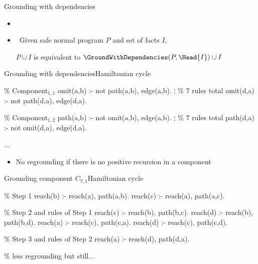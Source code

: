 \begin{frame}{Grounding with dependencies}
  \bigskip
  \begin{itemize}
  \item []


  \bigskip
  \item<2->  \ Given safe normal program \(P\) and set of facts \(I\),

    \(P \cup I\) is equivalent to \(\GroundWithDependencies(P,\Head{I}) \cup I\)
  \end{itemize}
\end{frame}
\begin{frame}{Grounding with dependencies}{Hamiltonian cycle}
\begin{SemiVerbatim}{.9}
{\color{comment}\% Component\(_{1,1}\)}
omit(a,b) :- not path(a,b), \alert{edge(a,b)}.
          \(\vdots\) {\color{comment}\% 7 rules total}
omit(d,a) :- not path(d,a), \alert{edge(d,a)}.

{\color{comment}\% Component\(_{1,2}\)}
path(a,b) :- not omit(a,b), \alert{edge(a,b)}.
          \(\vdots\) {\color{comment}\% 7 rules total}
path(d,a) :- not omit(d,a), \alert{edge(d,a)}.

...
\end{SemiVerbatim}
\vspace{-.8cm}
\begin{itemize}
\item<2-> No regrounding if there is no positive recursion in a component
\end{itemize}
\smallskip
\end{frame}
\begin{frame}{Grounding component \(C_{7,1}\)}{Hamiltonian cycle}
\begin{SemiVerbatim}{.9}
{\color{comment}\% Step 1}
reach(b) :- \alert{reach(a)}, \alert{path(a,b)}.
reach(c) :- \alert{reach(a)}, \alert{path(a,c)}.

{\color{comment}\% Step 2 \alert{and} rules of Step 1}
reach(c) :- \alert{reach(b)}, path(b,c).
reach(d) :- \alert{reach(b)}, path(b,d).
reach(a) :- \alert{reach(c)}, path(c,a).
reach(d) :- \alert{reach(c)}, path(c,d).

{\color{comment}\% Step 3 \alert{and} rules of Step 2}
reach(a) :- \alert{reach(d)}, path(d,a).

{\color{comment}\% less regrounding but still...}
\end{SemiVerbatim}
\end{frame}
%
